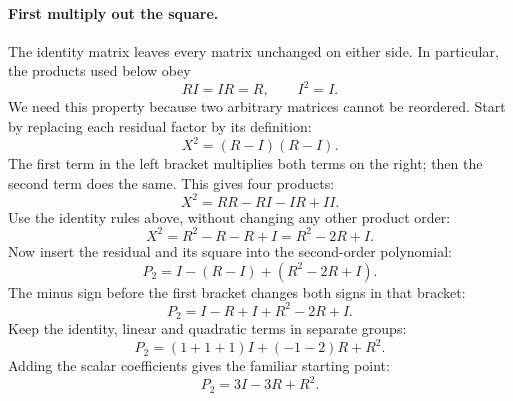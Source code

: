 \documentclass[11pt]{article}
\begin{document}
\paragraph{First multiply out the square.}
The identity matrix leaves every matrix unchanged on either side. In
particular, the products used below obey
\begin{equation}
 RI=IR=R,\qquad I^2=I.
\end{equation}
We need this property because two arbitrary matrices cannot be reordered.
Start by replacing each residual factor by its definition:
\begin{equation}
 X^2=(R-I)(R-I).
\end{equation}
The first term in the left bracket multiplies both terms on the right;
then the second term does the same. This gives four products:
\begin{equation}
 X^2=RR-RI-IR+II.
\end{equation}
Use the identity rules above, without changing any other product order:
\begin{equation}
 X^2=R^2-R-R+I=R^2-2R+I.
\end{equation}
Now insert the residual and its square into the second-order polynomial:
\begin{equation}
 P_2=I-(R-I)+(R^2-2R+I).
\end{equation}
The minus sign before the first bracket changes both signs in that bracket:
\begin{equation}
 P_2=I-R+I+R^2-2R+I.
\end{equation}
Keep the identity, linear and quadratic terms in separate groups:
\begin{equation}
 P_2=(1+1+1)I+(-1-2)R+R^2.
\end{equation}
Adding the scalar coefficients gives the familiar starting point:
\begin{equation}
 P_2=3I-3R+R^2.
\end{equation}
\end{document}

